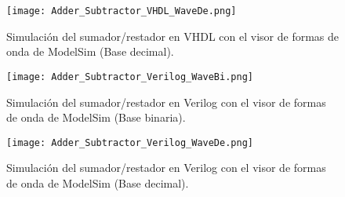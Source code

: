 \begin{figure}[ht]
	\centering
	\texttt{[image: Adder\_Subtractor\_VHDL\_WaveDe.png]}
	\caption{Simulación del sumador/restador en VHDL con el visor de formas de onda de ModelSim (Base decimal). \label{fig:adder_subtractor_vhdl_WaveDe}}
\end{figure}

\begin{figure}[ht]
	\centering
	\texttt{[image: Adder\_Subtractor\_Verilog\_WaveBi.png]}
	\caption{Simulación del sumador/restador en Verilog con el visor de formas de onda de ModelSim (Base binaria). \label{fig:adder_subtractor_verilog_WaveBi}}
\end{figure}

\begin{figure}[ht]
	\centering
	\texttt{[image: Adder\_Subtractor\_Verilog\_WaveDe.png]}
	\caption{Simulación del sumador/restador en Verilog con el visor de formas de onda de ModelSim (Base decimal). \label{fig:adder_subtractor_verilog_WaveDe}}
\end{figure}